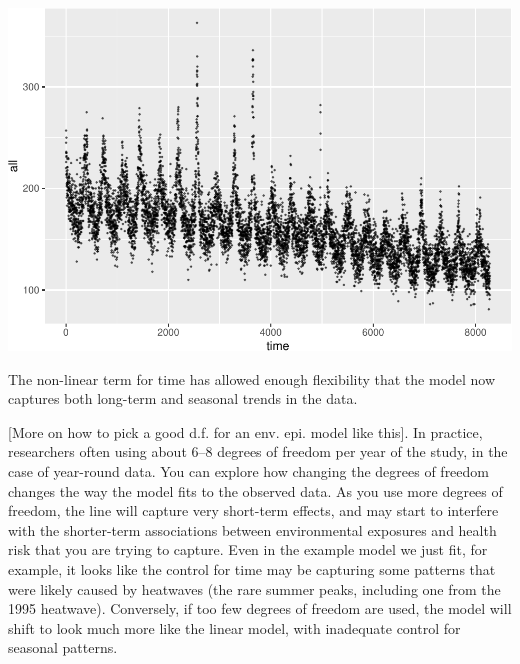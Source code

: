 \documentclass[
]{book}
\begin{document}
\includegraphics{adv_epi_analysis_files/figure-latex/unnamed-chunk-48-1.pdf}

The non-linear term for time has allowed enough flexibility that the model now
captures both long-term and seasonal trends in the data.

{[}More on how to pick a good d.f. for an env. epi. model like this{]}. In practice,
researchers often using about 6--8 degrees of freedom per year of the study, in
the case of year-round data. You can explore how changing the degrees of freedom
changes the way the model fits to the observed data. As you use more degrees of
freedom, the line will capture very short-term effects, and may start to
interfere with the shorter-term associations between environmental exposures and
health risk that you are trying to capture. Even in the example model we just
fit, for example, it looks like the control for time may be capturing some
patterns that were likely caused by heatwaves (the rare summer peaks, including
one from the 1995 heatwave). Conversely, if too few degrees of freedom are used,
the model will shift to look much more like the linear model, with inadequate
control for seasonal patterns.
\end{document}
